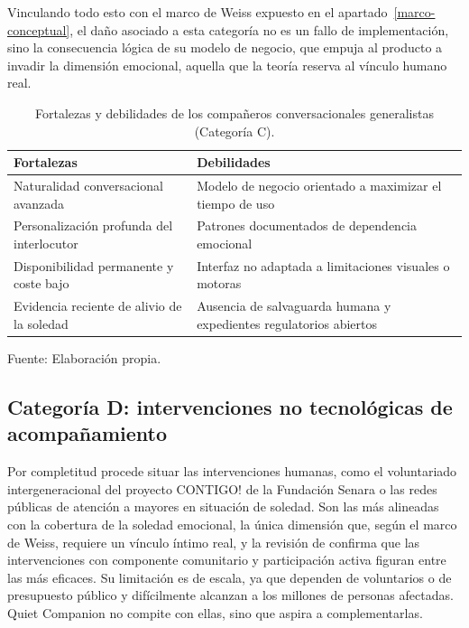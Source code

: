 Vinculando todo esto con el marco de Weiss expuesto en el apartado~\ref{marco-conceptual}, el daño asociado a
esta categoría no es un fallo de implementación, sino la consecuencia lógica de su modelo de negocio, que
empuja al producto a invadir la dimensión emocional, aquella que la teoría reserva al vínculo humano real.

\begin{table}[htbp]
    \centering
    \caption{Fortalezas y debilidades de los compañeros conversacionales generalistas (Categoría C).}
    \label{tab:cat-c-generalistas}
    \begin{tabularx}{\textwidth}{>{\RaggedRight\arraybackslash}X >{\RaggedRight\arraybackslash}X}
        \toprule
        \textbf{Fortalezas} & \textbf{Debilidades} \\
        \midrule
        Naturalidad conversacional avanzada & Modelo de negocio orientado a maximizar el tiempo de uso \\
        Personalización profunda del interlocutor & Patrones documentados de dependencia emocional \\
        Disponibilidad permanente y coste bajo & Interfaz no adaptada a limitaciones visuales o motoras \\
        Evidencia reciente de alivio de la soledad & Ausencia de salvaguarda humana y expedientes regulatorios abiertos \\
        \bottomrule
    \end{tabularx}

    \vspace{2pt}
    {\footnotesize Fuente: Elaboración propia.}
\end{table}

\subsection{Categoría D: intervenciones no tecnológicas de acompañamiento}

Por completitud procede situar las intervenciones humanas, como el voluntariado intergeneracional del
proyecto CONTIGO! de la Fundación Senara \citep{Senara} o las redes públicas de atención a mayores en
situación de soledad. Son las más alineadas con la cobertura de la soledad emocional, la única dimensión que,
según el marco de Weiss, requiere un vínculo íntimo real, y la revisión de \textcite{Gardiner2018} confirma
que las intervenciones con componente comunitario y participación activa figuran entre las más eficaces. Su
limitación es de escala, ya que dependen de voluntarios o de presupuesto público y difícilmente alcanzan a los
millones de personas afectadas. Quiet Companion no compite con ellas, sino que aspira a complementarlas.

